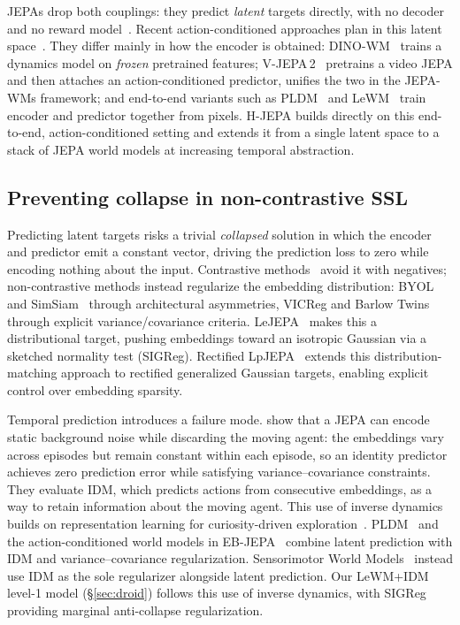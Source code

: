 JEPAs drop both couplings: they predict
\emph{latent} targets directly, with no decoder and no reward model~\citep{lecun2022path,assran2023ijepa,bardes2024vjepa}.
Recent action-conditioned approaches plan in this latent space~\citep{terver2026whatdrives,NWM,baldassarre2025dinoworld,wang2026adajepa,wang2026straightening,terver2026ebjepa,kuang2026lpwm,nilaksh2026reconstructionsemantics}.
They differ mainly in how the encoder is obtained: DINO-WM~\citep{zhou2025dinowm} trains a dynamics model on
\emph{frozen} pretrained features; V-JEPA\,2~\citep{assran2025vjepa2} pretrains a video JEPA and then attaches an action-conditioned predictor, \citet{terver2026whatdrives}
unifies the two in the JEPA-WMs framework; and end-to-end variants such as PLDM~\citep{sobal2025pldm} and LeWM~\citep{maes2026lewm} train encoder and predictor together from pixels.
H-JEPA builds directly on this end-to-end, action-conditioned setting and
extends it from a single latent space to a stack of JEPA world models at increasing
temporal abstraction.

\subsection{Preventing collapse in non-contrastive SSL}
Predicting latent targets risks a trivial \emph{collapsed} solution in which the
encoder and predictor emit a constant vector, driving the prediction loss to zero while
encoding nothing about the input. Contrastive methods~\citep{chen2020simclr,caron2021dino} avoid it with negatives; non-contrastive methods
instead regularize the embedding distribution: BYOL and SimSiam~\citep{grill2020byol,chen2021simsiam,ponce2026dualperspectives} through architectural asymmetries, VICReg and
Barlow Twins~\citep{bardes2022vicreg,zbontar2021barlow} through explicit
variance/covariance criteria. LeJEPA~\citep{balestriero2025lejepa} makes this a
distributional target, pushing embeddings toward an isotropic Gaussian via a sketched
normality test (SIGReg). Rectified LpJEPA~\citep{kuang2026rectifiedlpjepa}
extends this distribution-matching approach to rectified generalized Gaussian targets,
enabling explicit control over embedding sparsity.

Temporal prediction introduces a failure mode. \citet{sobal2022slowfeatures}
show that a JEPA can encode static background noise while discarding the moving agent:
the embeddings vary across episodes but remain constant within each episode, so
an identity predictor achieves zero prediction error while satisfying
variance--covariance constraints. They evaluate IDM,
which predicts actions from consecutive embeddings, as a way to retain information
about the moving agent. This use of inverse dynamics builds on representation learning
for curiosity-driven exploration~\citep{pathak2017curiosity}.
PLDM~\citep{sobal2025pldm} and the action-conditioned world models in
EB-JEPA~\citep{terver2026ebjepa} combine latent prediction with IDM and
variance--covariance regularization. Sensorimotor World Models~\citep{sensorimotorworldmodels}
instead use IDM as the sole regularizer alongside latent prediction.
Our LeWM+IDM level-1 model (\S\ref{sec:droid}) follows this use of inverse dynamics,
with SIGReg providing marginal anti-collapse regularization.

